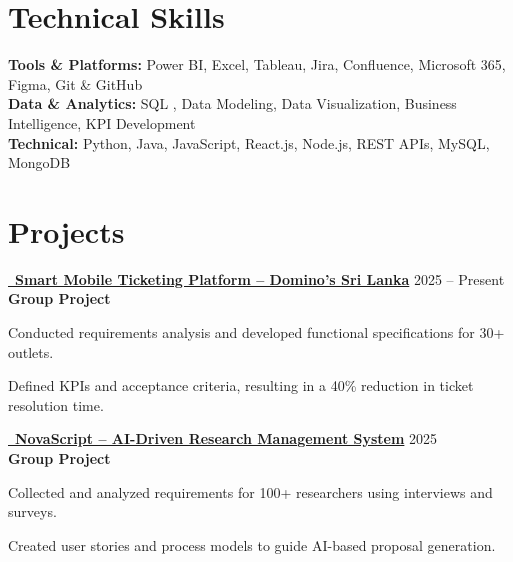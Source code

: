 \documentclass[letterpaper,12pt]{article}
\newenvironment{resume_list}{
  \vspace{-1pt}
  \begin{itemize}[itemsep=2pt, leftmargin=14pt]
}{
  \end{itemize}\vspace{-2pt}
}
\begin{document}
\section{Technical Skills}
\vspace{-1pt}

\textbf{Tools \& Platforms:} Power BI, Excel, Tableau, Jira, Confluence, Microsoft 365, Figma, Git \& GitHub\\[3pt]
\textbf{Data \& Analytics:} SQL , Data Modeling, Data Visualization, Business Intelligence, KPI Development\\[3pt]
\textbf{Technical:} Python, Java, JavaScript, React.js, Node.js, REST APIs, MySQL, MongoDB

\section{Projects}
\vspace{-2pt}

\newcommand{\project}[5]{%
  \noindent
  \href{#1}{\faGithub~\textbf{#2}} \hfill #3\\[-1pt]
  \textbf{#4}\\[-5pt]
  \begin{resume_list}
    #5
  \end{resume_list}
  \vspace{4pt}
}

\project{https://github.com/fixpoint-tech}
{Smart Mobile Ticketing Platform – Domino's Sri Lanka}
{2025 – Present}
{Group Project}{
  \item Conducted requirements analysis and developed functional specifications for 30+ outlets.
  \item Defined KPIs and acceptance criteria, resulting in a 40\% reduction in ticket resolution time.
}

\vspace{6pt}
\project{https://github.com/Chandima0406/NovaScript.git}
{NovaScript – AI-Driven Research Management System}
{2025}
{Group Project}{
  \item Collected and analyzed requirements for 100+ researchers using interviews and surveys.
  \item Created user stories and process models to guide AI-based proposal generation.
}
\end{document}
